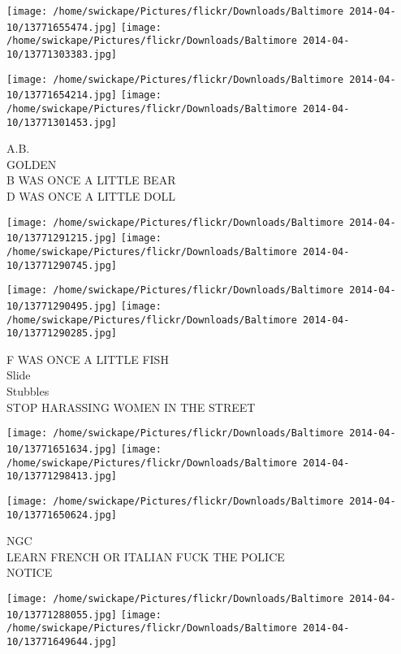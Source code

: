 \documentclass[10pt,letterpaper]{article}
\begin{document}
\texttt{[image: /home/swickape/Pictures/flickr/Downloads/Baltimore 2014-04-10/13771655474.jpg]}
\texttt{[image: /home/swickape/Pictures/flickr/Downloads/Baltimore 2014-04-10/13771303383.jpg]}

\texttt{[image: /home/swickape/Pictures/flickr/Downloads/Baltimore 2014-04-10/13771654214.jpg]}
\texttt{[image: /home/swickape/Pictures/flickr/Downloads/Baltimore 2014-04-10/13771301453.jpg]}

A.B.\\
GOLDEN\\
B WAS ONCE A LITTLE BEAR\\
D WAS ONCE A LITTLE DOLL\\
\pagebreak

\texttt{[image: /home/swickape/Pictures/flickr/Downloads/Baltimore 2014-04-10/13771291215.jpg]}
\texttt{[image: /home/swickape/Pictures/flickr/Downloads/Baltimore 2014-04-10/13771290745.jpg]}

\texttt{[image: /home/swickape/Pictures/flickr/Downloads/Baltimore 2014-04-10/13771290495.jpg]}
\texttt{[image: /home/swickape/Pictures/flickr/Downloads/Baltimore 2014-04-10/13771290285.jpg]}

F WAS ONCE A LITTLE FISH\\
Slide\\
Stubbles\\
STOP HARASSING WOMEN IN THE STREET\\
\pagebreak

\texttt{[image: /home/swickape/Pictures/flickr/Downloads/Baltimore 2014-04-10/13771651634.jpg]}
\texttt{[image: /home/swickape/Pictures/flickr/Downloads/Baltimore 2014-04-10/13771298413.jpg]}

\vspace{0.25in}
\texttt{[image: /home/swickape/Pictures/flickr/Downloads/Baltimore 2014-04-10/13771650624.jpg]}

NGC\\
LEARN FRENCH OR ITALIAN FUCK THE POLICE\\
NOTICE\\
\pagebreak

\texttt{[image: /home/swickape/Pictures/flickr/Downloads/Baltimore 2014-04-10/13771288055.jpg]}
\texttt{[image: /home/swickape/Pictures/flickr/Downloads/Baltimore 2014-04-10/13771649644.jpg]}
\end{document}
